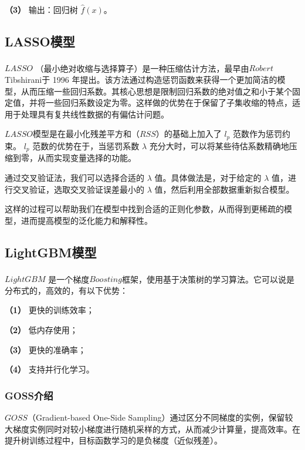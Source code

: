 \documentclass[withoutpreface,bwprint]{cumcmthesis}
\begin{document}
\textbf{（3）} 输出：回归树 \( \hat{f}(x) \)。


\subsection{LASSO模型}

\(LASSO\) \textsuperscript{\cite{rasmussen2012tutorial}}（最小绝对收缩与选择算子）是一种压缩估计方法，最早由\(Robert\) Tibshirani于 1996 年提出。该方法通过构造惩罚函数来获得一个更加简洁的模型，从而压缩一些回归系数。其核心思想是限制回归系数的绝对值之和小于某个固定值，并将一些回归系数设定为零。这样做的优势在于保留了子集收缩的特点，适用于处理具有复共线性数据的有偏估计问题。

\(LASSO\)模型是在最小化残差平方和（\(RSS\)）的基础上加入了 \( l_p \) 范数作为惩罚约束。 \( l_p \) 范数的优势在于，当惩罚系数 \( \lambda \) 充分大时，可以将某些待估系数精确地压缩到零，从而实现变量选择的功能。

通过交叉验证法，我们可以选择合适的 \( \lambda \) 值。具体做法是，对于给定的 \( \lambda \) 值，进行交叉验证，选取交叉验证误差最小的 \( \lambda \) 值，然后利用全部数据重新拟合模型。

这样的过程可以帮助我们在模型中找到合适的正则化参数，从而得到更稀疏的模型，进而提高模型的泛化能力和解释性。


\subsection{LightGBM模型}

\(LightGBM\) \textsuperscript{\cite{nam2023apply}}是一个梯度\(Boosting\)框架，使用基于决策树的学习算法。它可以说是分布式的，高效的，有以下优势：

\textbf{（1）} 更快的训练效率；

\textbf{（2）} 低内存使用；

\textbf{（3）} 更快的准确率；

\textbf{（4）} 支持并行化学习。


\subsubsection{GOSS介绍}

\(GOSS\)（Gradient-based One-Side Sampling）通过区分不同梯度的实例，保留较大梯度实例同时对较小梯度进行随机采样的方式，从而减少计算量，提高效率。在提升树训练过程中，目标函数学习的是负梯度（近似残差）。
\end{document}
